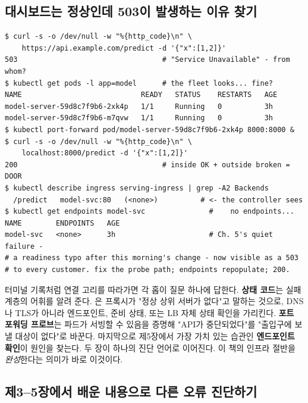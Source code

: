 \subsection*{대시보드는 정상인데 503이 발생하는 이유 찾기}

\begin{terminalbox}
\begin{Verbatim}[breaklines=true,breakanywhere=true,fontsize=\small,formatcom=\color{tbbtermfg},codes=\tbbcodeactive]
$ curl -s -o /dev/null -w "%{http_code}\n" \
    https://api.example.com/predict -d '{"x":[1,2]}'
503                                  # "Service Unavailable" - from whom?
$ kubectl get pods -l app=model      # the fleet looks... fine?
NAME                            READY   STATUS    RESTARTS   AGE
model-server-59d8c7f9b6-2xk4p   1/1     Running   0          3h
model-server-59d8c7f9b6-m7qvw   1/1     Running   0          3h
$ kubectl port-forward pod/model-server-59d8c7f9b6-2xk4p 8000:8000 &
$ curl -s -o /dev/null -w "%{http_code}\n" \
    localhost:8000/predict -d '{"x":[1,2]}'
200                                  # inside OK + outside broken = DOOR
$ kubectl describe ingress serving-ingress | grep -A2 Backends
  /predict   model-svc:80   (<none>)          # <- the controller sees
$ kubectl get endpoints model-svc               #    no endpoints...
NAME        ENDPOINTS   AGE
model-svc   <none>      3h                      # Ch. 5's quiet failure -
# a readiness typo after this morning's change - now visible as a 503
# to every customer. fix the probe path; endpoints repopulate; 200.
\end{Verbatim}
\end{terminalbox}

터미널 기록처럼 연결 고리를 따라가면 각 홉이 질문 하나에 답한다. \textbf{상태 코드}는 실패 계층의 어휘를 알려 준다. 은 프록시가 "정상 상위 서버가 없다"고 말하는 것으로, DNS나 TLS가 아니라 엔드포인트, 준비 상태, 또는 LB 자체 상태 확인을 가리킨다. \textbf{포트 포워딩 프로브}는 파드가 서빙할 수 있음을 증명해 "API가 중단되었다"를 "출입구에 보낼 대상이 없다"로 바꾼다. 마지막으로 제5장에서 가장 가치 있는 습관인 \textbf{엔드포인트 확인}이 원인을 찾는다. 두 장이 하나의 진단 언어로 이어진다. 이 책의 인프라 절반을 \textit{완성}한다는 의미가 바로 이것이다.

\subsection*{제3–5장에서 배운 내용으로 다른 오류 진단하기}

